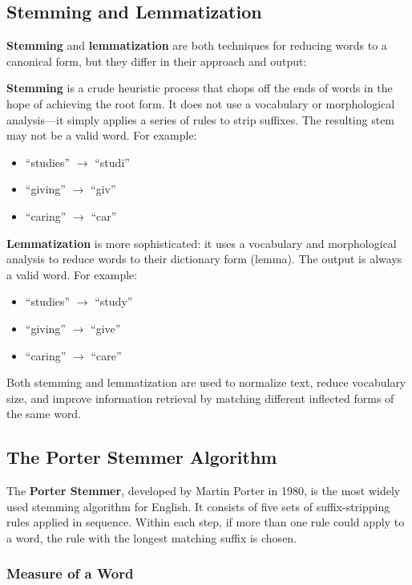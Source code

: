 \documentclass[11pt,a4paper]{article}
\begin{document}
\subsection{Stemming and Lemmatization}

\textbf{Stemming} and \textbf{lemmatization} are both techniques for reducing words to a canonical form, but they differ in their approach and output:

\textbf{Stemming} is a crude heuristic process that chops off the ends of words in the hope of achieving the root form. It does not use a vocabulary or morphological analysis---it simply applies a series of rules to strip suffixes. The resulting stem may not be a valid word. For example:
\begin{itemize}
    \item ``studies'' $\to$ ``studi''
    \item ``giving'' $\to$ ``giv''
    \item ``caring'' $\to$ ``car''
\end{itemize}

\textbf{Lemmatization} is more sophisticated: it uses a vocabulary and morphological analysis to reduce words to their dictionary form (lemma). The output is always a valid word. For example:
\begin{itemize}
    \item ``studies'' $\to$ ``study''
    \item ``giving'' $\to$ ``give''
    \item ``caring'' $\to$ ``care''
\end{itemize}

Both stemming and lemmatization are used to normalize text, reduce vocabulary size, and improve information retrieval by matching different inflected forms of the same word.

\subsection{The Porter Stemmer Algorithm}

The \textbf{Porter Stemmer}, developed by Martin Porter in 1980, is the most widely used stemming algorithm for English. It consists of five sets of suffix-stripping rules applied in sequence. Within each step, if more than one rule could apply to a word, the rule with the longest matching suffix is chosen.

\subsubsection{Measure of a Word}
\end{document}
